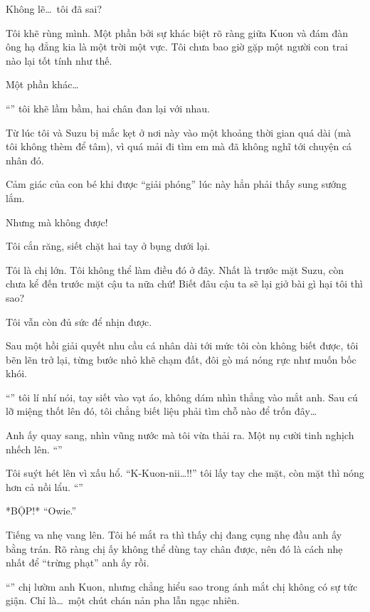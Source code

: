 \documentclass[../main.tex]{subfiles}
\begin{document}
Không lẽ\dots\ tôi đã sai?

Tôi khẽ rùng mình. Một phần bởi sự khác biệt rõ ràng giữa Kuon và đám đàn ông hạ đẳng kia là một trời một vực. Tôi chưa bao giờ gặp một người con trai nào lại tốt tính như thế.

Một phần khác\dots

``\textit{}'' tôi khẽ lầm bầm, hai chân đan lại với nhau.

Từ lúc tôi và Suzu bị mắc kẹt ở nơi này vào một khoảng thời gian quá dài (mà tôi không thèm để tâm), vì quá mải đi tìm em mà đã không nghĩ tới chuyện cá nhân đó.

Cảm giác của con bé khi được ``giải phóng'' lúc này hẳn phải thấy sung sướng lắm.

Nhưng mà không được!

Tôi cắn răng, siết chặt hai tay ở bụng dưới lại.

Tôi là chị lớn. Tôi không thể làm điều đó ở đây. Nhất là trước mặt Suzu, còn chưa kể đến trước mặt cậu ta nữa chứ! Biết đâu cậu ta sẽ lại giở bài gì hại tôi thì sao?

Tôi vẫn còn đủ sức để nhịn được.


Sau một hồi giải quyết nhu cầu cá nhân dài tới mức tôi còn không biết được, tôi bẽn lẽn trở lại, từng bước nhỏ khẽ chạm đất, đôi gò má nóng rực như muốn bốc khói.

``'' tôi lí nhí nói, tay siết vào vạt áo, không dám nhìn thẳng vào mắt anh. Sau cú lỡ miệng thốt lên đó, tôi chẳng biết liệu phải tìm chỗ nào để trốn đây\dots

Anh ấy quay sang, nhìn vũng nước mà tôi vừa thải ra. Một nụ cười tinh nghịch nhếch lên. ``''

Tôi suýt hét lên vì xấu hổ. ``K-Kuon-nii\dots!!'' tôi lấy tay che mặt, còn mặt thì nóng hơn cả nồi lẩu. ``''

*BỘP!* ``Owie.''

Tiếng va nhẹ vang lên. Tôi hé mắt ra thì thấy chị đang cụng nhẹ đầu anh ấy bằng trán. Rõ ràng chị ấy không thể dùng tay chân được, nên đó là cách nhẹ nhất để ``trừng phạt'' anh ấy rồi.

``'' chị lườm anh Kuon, nhưng chẳng hiểu sao trong ánh mắt chị không có sự tức giận. Chỉ là\dots\ một chút chán nản pha lẫn ngạc nhiên.
\end{document}
